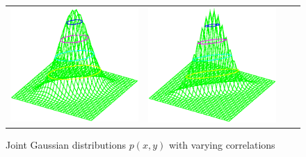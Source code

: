 \begin{figure}
\begin{tabular}{*{4}{c}}
  \includegraphics[width=4\tw/16, height=4\tw/16, clip=true]{../common/normxy_80.eps} & 
  \includegraphics[width=4\tw/16, height=4\tw/16, clip=true]{../common/normxy_95.eps}
\end{tabular}
\caption{
  Joint Gaussian distributions $p(x,y)$ with varying correlations
  \label{fig:psub_joint_gaussian}
  }
\end{figure}








